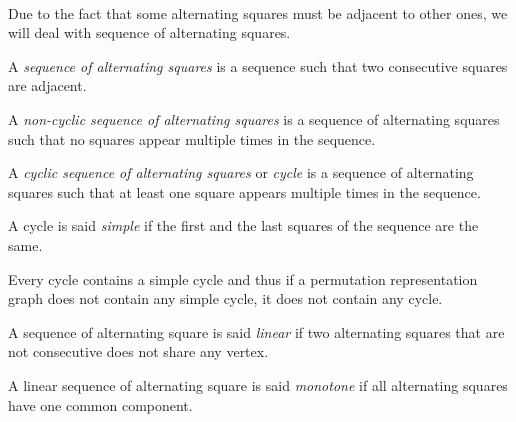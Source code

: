 \paragraph{}
Due to the fact that some alternating squares must be adjacent to other ones, we will deal with sequence of alternating squares.

\begin{definition}
  A \textit{sequence of alternating squares} is a sequence such that two consecutive squares are adjacent.
\end{definition}

\begin{definition}
  A \textit{non-cyclic sequence of alternating squares} is a sequence of alternating squares such that no squares appear multiple times in the sequence.
\end{definition}

\begin{definition}
  A \textit{cyclic sequence of alternating squares} or \textit{cycle} is a sequence of alternating squares such that at least one square appears multiple times in the sequence.
\end{definition}

\begin{definition}
  A cycle is said \textit{simple} if the first and the last squares of the sequence are the same.
\end{definition}

\begin{corollary}
  \label{cycle-simple-cycle}
  Every cycle contains a simple cycle and thus if a permutation representation graph does not contain any simple cycle, it does not contain any cycle.
\end{corollary}

\begin{definition}
    A sequence of alternating square is said \textit{linear} if two alternating squares that are not consecutive does not share any vertex.
\end{definition}

\begin{definition}
  A linear sequence of alternating square is said \textit{monotone} if all alternating squares have one common component.
\end{definition}

